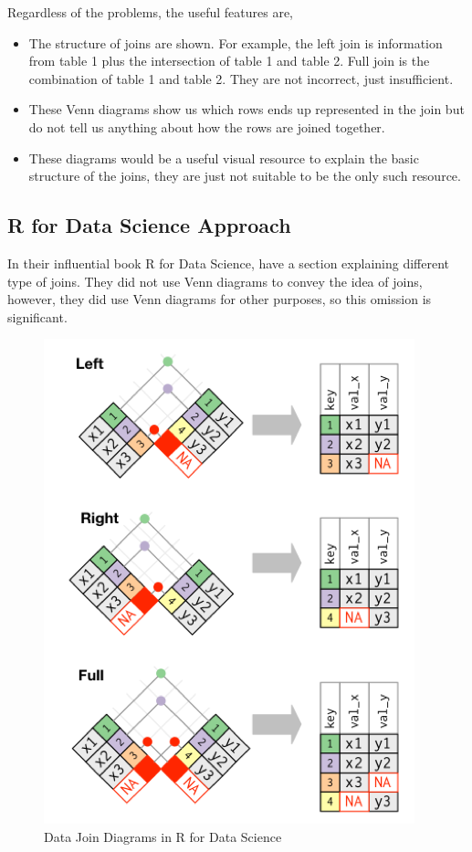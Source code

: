 Regardless of the problems, the useful features are,

\begin{itemize}
    \item The structure of joins are shown. For example, the left join is information from table 1 plus the intersection of table 1 and table 2. Full join is the combination of table 1 and table 2. They are not incorrect, just insufficient. 
    \item These Venn diagrams show us which rows ends up represented in the join but do not tell us anything about how the rows are joined together.
    \item These diagrams would be a useful visual resource to explain the basic structure of the joins, they are just not suitable to be the only such resource. 
\end{itemize}


\newpage

\subsection{R for Data Science Approach}
In their influential book R for Data Science, \citet*{Wickham:2017:RDS:3086927} have a section explaining different type of joins. They did not use Venn diagrams to convey the idea of joins, however, they did use Venn diagrams for other purposes, so this omission is significant. 

\begin{figure}[H]
    \centering
    \includegraphics[scale = 1.0]{Masters-Thesis/img/r4djoin.png}
    \caption{Data Join Diagrams in R for Data Science}
    \label{fig:r4djoin}
\end{figure}


